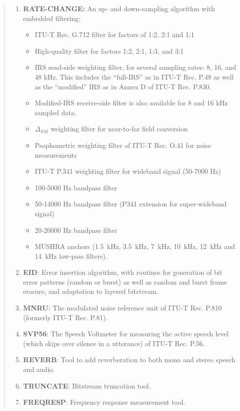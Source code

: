 \begin{quote}
\begin{enumerate}
\item {\bf RATE-CHANGE:} An up- and down-sampling algorithm with embedded filtering:
  \begin{itemize}
  \item ITU-T Rec. G.712 filter for factors of 1:2, 2:1 and 1:1
  \item High-quality filter for factors 1:2, 2:1, 1:3, and 3:1
  \item IRS send-side weighting filter, for several sampling rates: 8, 16, and 48 kHz. This includes the ``full-IRS'' as in ITU-T Rec. P.48 as well as the ``modified'' IRS as in Annex D of ITU-T Rec. P.830.
  \item Modified-IRS receive-side filter is also available for 8 and 16 kHz sampled data.
  \item $\Delta_{SM}$ weighting filter for near-to-far field conversion
  \item Psophometric weighting filter of ITU-T Rec. O.41 for noise measurements
  \item ITU-T P.341 weighting filter for wideband signal (50-7000 Hz)
  \item  100-5000 Hz bandpass filter
  \item  50-14000 Hz bandpass filter (P341 extension for super-wideband signal)
  \item  20-20000 Hz bandpass filter
  \item MUSHRA anchors (1.5~kHz, 3.5~kHz, 7~kHz, 10~kHz, 12~kHz and 14~kHz low-pass filters).
  \end{itemize}

\item {\bf EID}: Error insertion algorithm, with routines for generation of bit error patterns (random or burst) as well as random and burst frame erasure, and adaptation to layered bitstream.

\item {\bf MNRU}: The modulated noise reference unit of ITU-T Rec. P.810 (formerly ITU-T Rec. P.81).

\item {\bf SVP56}: The Speech Voltmeter for measuring the active speech level (which skips over silence in a utterance) of ITU-T Rec. P.56.

\item {\bf REVERB}: Tool to add reverberation to both mono and stereo speech and audio.

\item {\bf TRUNCATE}: Bitstream truncation tool.

\item {\bf FREQRESP}: Frequency response measurement tool.


\end{enumerate}
\end{quote}
